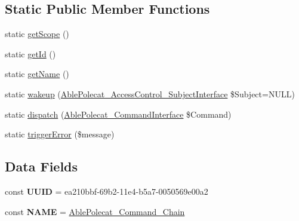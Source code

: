 \subsection*{Static Public Member Functions}
\begin{DoxyCompactItemize}
\item 
static \hyperlink{class_able_polecat___command___chain_ad9ade868bd136d32967059d1cccb3e92}{get\+Scope} ()
\item 
static \hyperlink{class_able_polecat___command___chain_acfaa3a96d0cb5a4c0d4d710dcba41e9e}{get\+Id} ()
\item 
static \hyperlink{class_able_polecat___command___chain_a4ef9bd37ba3ce8a13c1e8bcf4f72a630}{get\+Name} ()
\item 
static \hyperlink{class_able_polecat___command___chain_a3f2135f6ad45f51d075657f6d20db2cd}{wakeup} (\hyperlink{interface_able_polecat___access_control___subject_interface}{Able\+Polecat\+\_\+\+Access\+Control\+\_\+\+Subject\+Interface} \$Subject=N\+U\+L\+L)
\item 
static \hyperlink{class_able_polecat___command___chain_a8c95906f06450a060c5c9f0dc5b64fb5}{dispatch} (\hyperlink{interface_able_polecat___command_interface}{Able\+Polecat\+\_\+\+Command\+Interface} \$Command)
\item 
static \hyperlink{class_able_polecat___command___chain_ae121fc73d26ff0d391d4cd120f88a820}{trigger\+Error} (\$message)
\end{DoxyCompactItemize}
\subsection*{Data Fields}
\begin{DoxyCompactItemize}
\item 
\hypertarget{class_able_polecat___command___chain_a74b892c8c0b86bf9d04c5819898c51e7}{}const {\bfseries U\+U\+I\+D} = \textquotesingle{}ea210bbf-\/69b2-\/11e4-\/b5a7-\/0050569e00a2\textquotesingle{}\label{class_able_polecat___command___chain_a74b892c8c0b86bf9d04c5819898c51e7}

\item 
\hypertarget{class_able_polecat___command___chain_a244352f035b82b20b0efa506167fd862}{}const {\bfseries N\+A\+M\+E} = \textquotesingle{}\hyperlink{class_able_polecat___command___chain}{Able\+Polecat\+\_\+\+Command\+\_\+\+Chain}\textquotesingle{}\label{class_able_polecat___command___chain_a244352f035b82b20b0efa506167fd862}

\end{DoxyCompactItemize}
